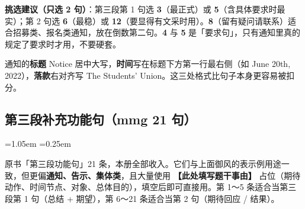 \documentclass[11pt,a4paper]{ctexart}
\newcommand{\fillin}[1]{{\bfseries【#1】}}
\newcommand{\kw}[1]{{\bfseries\color{accent}#1}}
\newcommand{\tip}[1]{\par\addvspace{3pt}\noindent{\bfseries【提示】}#1\par\addvspace{3pt}}
\newenvironment{note}{%
  \par\addvspace{5pt}%
  \begin{list}{}{\leftmargin=1.05em \rightmargin=0.25em \listparindent=0pt
    \itemindent=0pt \topsep=0pt \parsep=2pt \itemsep=2pt \partopsep=0pt}%
  \item\relax\small\color{ink}%
}{%
  \end{list}\addvspace{5pt}%
}
\begin{document}
\tip{\textbf{挑选建议（只选 2 句）}：第三段第 1 句选 \kw{3}（最正式）或 \kw{5}（含具体要求时最实）；第 2 句选 \kw{6}（最稳）或 \kw{12}（要显得有文采时用）。\kw{8}（留有疑问请联系）适合招募类、报名类通知，放在倒数第二句。\kw{4} 与 \kw{5} 是「要求句」，只有通知里真的规定了要求时才用，不要硬套。}

\tip{通知的\textbf{标题} Notice 居中大写，\textbf{时间}写在标题下方第一行最右侧（如 June 20th, 2022），\textbf{落款}右对齐写 The Students' Union。这三处格式比句子本身更容易被扣分。}


\subsection{第三段补充功能句（mmg 21 句）}

\begin{note}
原书「第三段功能句」21 条，本册全部收入。它们与上面御风的表示例用途一致，但更偏\textbf{通知、告示、集体类}，且大量使用 \fillin{此处填写题干事由} 占位（期待动作、时间节点、对象、总体目的），填空后即可直接用。第 1～5 条适合当第三段第 1 句（总结 + 期望），第 6～21 条适合当第 2 句（期待回应 / 结果）。
\end{note}
\end{document}
